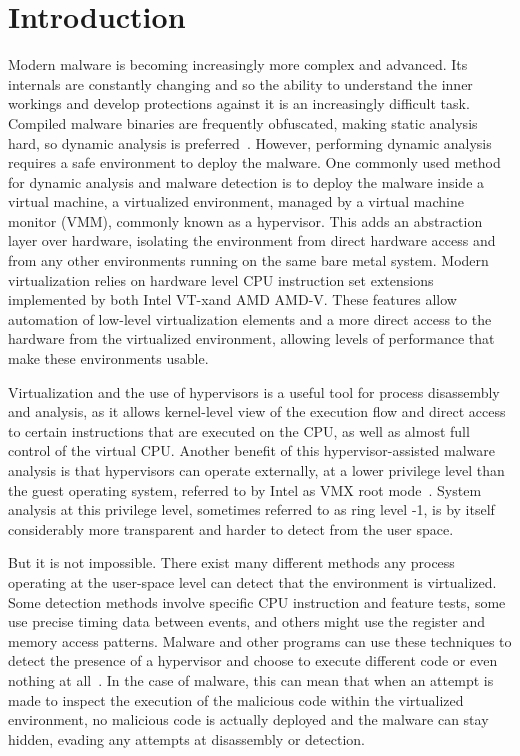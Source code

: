 \section{Introduction}\label{s:intro}

Modern malware is becoming increasingly more complex and advanced.
Its internals are constantly changing and so the ability to understand the inner workings and develop protections against it is an increasingly difficult task. 
Compiled malware binaries are frequently obfuscated, making static analysis hard, so dynamic analysis is preferred~\cite{Leon2021, 10.1145/2245276.2232070}. However, performing dynamic analysis requires a safe environment 
to deploy the malware. One commonly used method for dynamic analysis and malware detection is to deploy the malware inside a virtual machine, a virtualized environment, managed by a virtual machine monitor (VMM),
commonly known as a hypervisor. This adds an abstraction layer over hardware, isolating the environment from direct hardware access and from any other environments running on the same bare metal system. 
Modern virtualization relies on hardware level CPU instruction set extensions implemented by both Intel\textsuperscript{\tiny\textregistered} VT-x\texttrademark and AMD\textsuperscript{\tiny\textregistered} AMD-V\texttrademark. 
These features allow automation of low-level virtualization elements and a more direct access to the hardware from the virtualized environment, allowing levels of performance that make these environments usable.

Virtualization and the use of hypervisors is a useful tool for process disassembly and analysis, as it allows kernel-level view of the execution flow and direct access to certain instructions that are executed on the CPU, as well as almost full
control of the virtual CPU.
Another benefit of this hypervisor-assisted malware analysis is that hypervisors can operate externally, at a lower privilege level than the guest operating system, referred to by Intel as VMX root mode~\cite{Intel-SDM2025}.
System analysis at this privilege level, sometimes referred to as ring level -1,  is by itself considerably more transparent and harder to detect from the user space.

But it is not impossible. There exist many different methods any process operating at the user-space level can detect that the environment is virtualized. 
Some detection methods involve specific CPU instruction and feature tests, some use precise timing data between events, and others might use the register and memory access patterns. 
Malware and other programs can use these techniques to detect the presence of a hypervisor and choose to execute different code or even nothing at all~\cite{10.1109/TIFS.2020.2976559}. 
In the case of malware, this can mean that when an attempt is made to inspect the execution of the malicious code within the virtualized environment, 
no malicious code is actually deployed and the malware can stay hidden, evading any attempts at disassembly or detection.

